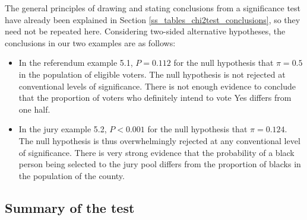 The general principles of drawing and stating conclusions from a
significance test have already been explained in Section
\ref{ss_tables_chi2test_conclusions}, so they need not be repeated here.
Considering two-sided alternative hypotheses, the conclusions in our
two examples are as follows:
\begin{itemize}
\item
In the referendum example 5.1, $P=0.112$ for the null hypothesis that
$\pi=0.5$ in the population of eligible voters. The null hypothesis is
not rejected at conventional levels of significance. There is not enough
evidence to conclude that the proportion of voters who definitely intend
to vote Yes differs from one half.
\item
In the jury example 5.2, $P<0.001$ for the null hypothesis that
$\pi=0.124$. The null hypothesis is thus overwhelmingly rejected at any
conventional level of significance. There is very strong evidence that
the probability of a black person being selected to the jury pool
differs from the proportion of blacks in the population of the county.
\end{itemize}

\subsection{Summary of the test}
\label{ss_probs_test1sample_summary}

